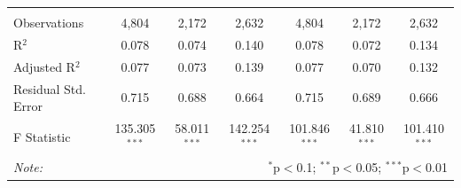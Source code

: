 \documentclass[alpha-refs]{wiley-article-01g}
\begin{document}
\begin{landscape}
\begin{table}[!htbp]
\begin{tabular}{@{\extracolsep{5pt}}lcccccc}
			& & & & & & \\ 
			\hline \\[-.8ex] 
			Observations & 4,804 & 2,172 & 2,632 & 4,804 & 2,172 & 2,632 \\ 
			R$^{2}$ & 0.078 & 0.074 & 0.140 & 0.078 & 0.072 & 0.134 \\ 
			Adjusted R$^{2}$ & 0.077 & 0.073 & 0.139 & 0.077 & 0.070 & 0.132 \\ 
			Residual Std. Error & 0.715 & 0.688 & 0.664 & 0.715 & 0.689 & 0.666 \\ 
			F Statistic & 135.305$^{***}$ & 58.011$^{***}$ & 142.254$^{***}$ & 101.846$^{***}$ & 41.810$^{***}$ & 101.410$^{***}$ \\ 
			\hline 
			\textit{Note:}  & \multicolumn{6}{r}{$^{*}$p$<$0.1; $^{**}$p$<$0.05; $^{***}$p$<$0.01} \\ 
		\end{tabular} 
	\end{table} 
	
\end{landscape}

\newpage
\end{document}
